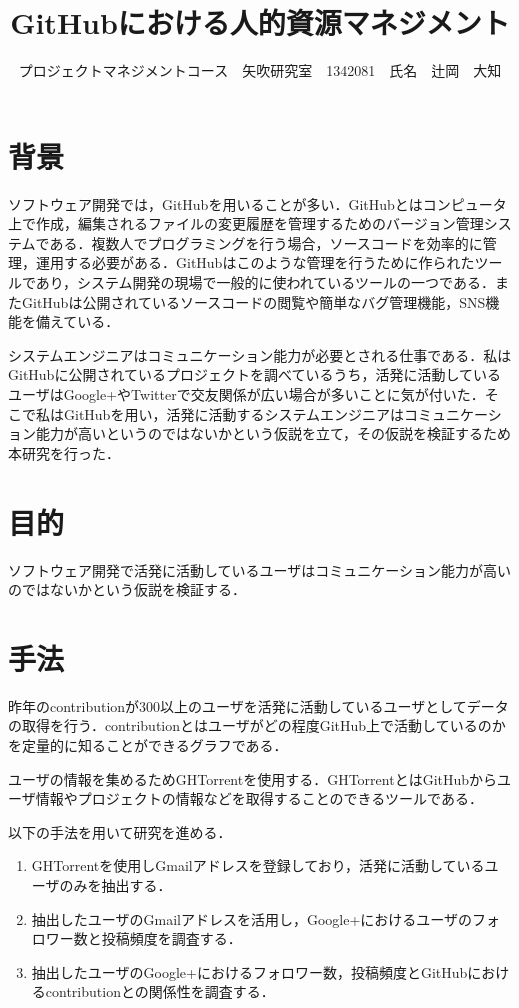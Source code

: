 \documentclass[uplatex,twocolumn,dvipdfmx]{jsarticle}
\title{\vspace{-5mm}\fontsize{14pt}{0pt}\selectfont GitHubにおける人的資源マネジメント}
\author{\normalsize プロジェクトマネジメントコース　矢吹研究室　1342081　氏名　辻岡　大知}
\date{}
\begin{document}
\fontsize{10.5pt}{\baselineskip}\selectfont
\maketitle





\section{背景}

ソフトウェア開発では，GitHubを用いることが多い．GitHubとはコンピュータ上で作成，編集されるファイルの変更履歴を管理するためのバージョン管理システムである．複数人でプログラミングを行う場合，ソースコードを効率的に管理，運用する必要がある．GitHubはこのような管理を行うために作られたツールであり，システム開発の現場で一般的に使われているツールの一つである\cite{a}．またGitHubは公開されているソースコードの閲覧や簡単なバグ管理機能，SNS機能を備えている．

システムエンジニアはコミュニケーション能力が必要とされる仕事である．私はGitHubに公開されているプロジェクトを調べているうち，活発に活動しているユーザはGoogle+やTwitterで交友関係が広い場合が多いことに気が付いた．そこで私はGitHubを用い，活発に活動するシステムエンジニアはコミュニケーション能力が高いというのではないかという仮説を立て，その仮説を検証するため本研究を行った．


\section{目的}

ソフトウェア開発で活発に活動しているユーザはコミュニケーション能力が高いのではないかという仮説を検証する．

\section{手法}

昨年のcontributionが300以上のユーザを活発に活動しているユーザとしてデータの取得を行う．contributionとはユーザがどの程度GitHub上で活動しているのかを定量的に知ることができるグラフである．

ユーザの情報を集めるためGHTorrentを使用する．GHTorrentとはGitHubからユーザ情報やプロジェクトの情報などを取得することのできるツールである．

以下の手法を用いて研究を進める．

\begin{enumerate}
 \item GHTorrent\cite{GHTorrent}を使用しGmailアドレスを登録しており，活発に活動しているユーザのみを抽出する．
 \item 抽出したユーザのGmailアドレスを活用し，Google+におけるユーザのフォロワー数と投稿頻度を調査する．
 \item 抽出したユーザのGoogle+におけるフォロワー数，投稿頻度とGitHubにおけるcontributionとの関係性を調査する．
\end{enumerate}
\end{document}
